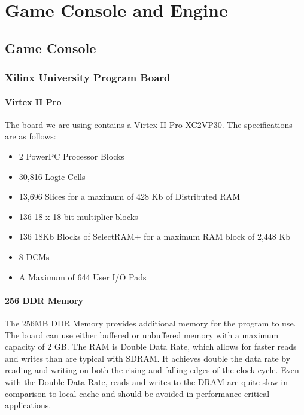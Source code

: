 \documentclass[11pt,letter,oneside]{report}
\begin{document}
\chapter{Game Console and Engine}

\section{Game Console}
\subsection{Xilinx University Program Board}
	\subsubsection{Virtex II Pro}
		The board we are using contains a Virtex II Pro XC2VP30. The specifications are as follows:
		\begin{itemize}
			\item 2 PowerPC Processor Blocks
			\item 30,816 Logic Cells
			\item 13,696 Slices for a maximum of 428 Kb of Distributed RAM
			\item 136 18 x 18 bit multiplier blocks
			\item 136 18Kb Blocks of SelectRAM+ for a maximum RAM block of 2,448 Kb
			\item 8 DCMs
			\item A Maximum of 644 User I/O Pads
		\end{itemize}
   	\subsubsection{256 DDR Memory}
		The 256MB DDR Memory provides additional memory for the program to use.    The board can use either buffered or unbuffered memory with a maximum capacity of 2 GB.  The RAM is Double Data Rate, which allows for faster reads and writes than are typical with SDRAM.  It achieves double the data rate by reading and writing on both the rising and falling edges of the clock cycle.  Even with the Double Data Rate, reads and writes to the DRAM are quite slow in comparison to local cache and should be avoided in performance critical applications.
\end{document}
